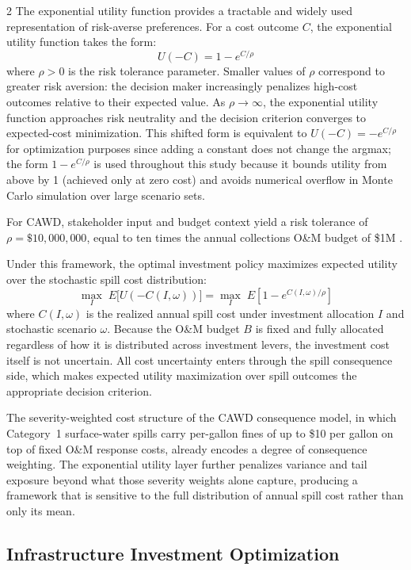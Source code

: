 \documentclass[10pt]{article}
\begin{document}
\begin{multicols}{2}
The exponential utility function provides a tractable and widely used
representation of risk-averse preferences. For a cost outcome $C$, the
exponential utility function takes the form:
%
\[
U(-C) = 1 - e^{C/\rho}
\]
%
where $\rho > 0$ is the risk tolerance parameter. Smaller values of
$\rho$ correspond to greater risk aversion: the decision maker
increasingly penalizes high-cost outcomes relative to their expected
value. As $\rho \to \infty$, the exponential utility function
approaches risk neutrality and the decision criterion converges to
expected-cost minimization. This shifted form is equivalent to
$U(-C) = -e^{C/\rho}$ for optimization purposes since adding a
constant does not change the argmax; the form $1 - e^{C/\rho}$ is
used throughout this study because it bounds utility from above by 1
(achieved only at zero cost) and avoids numerical overflow in Monte
Carlo simulation over large scenario sets.
 
For CAWD, stakeholder input and budget context yield a risk tolerance
of $\rho = \$10{,}000{,}000$, equal to ten times the annual
collections O\&M budget of \$1M \citep{cawd_budget2025}.
 
Under this framework, the optimal investment policy maximizes expected
utility over the stochastic spill cost distribution:
%
\[
\max_{I} \; E\bigl[U(-C(I,\omega))\bigr]
    = \max_{I} \; E\!\left[1 - e^{C(I,\omega)/\rho}\right]
\]
%
where $C(I,\omega)$ is the realized annual spill cost under investment
allocation $I$ and stochastic scenario $\omega$. Because the O\&M
budget $B$ is fixed and fully allocated regardless of how it is
distributed across investment levers, the investment cost itself is
not uncertain. All cost uncertainty enters through the spill
consequence side, which makes expected utility maximization over
spill outcomes the appropriate decision criterion.
 
The severity-weighted cost structure of the CAWD consequence model,
in which Category~1 surface-water spills carry per-gallon fines of
up to \$10 per gallon on top of fixed O\&M response costs, already
encodes a degree of consequence weighting. The exponential utility
layer further penalizes variance and tail exposure beyond what those
severity weights alone capture, producing a framework that is
sensitive to the full distribution of annual spill cost rather than
only its mean.

\subsection{Infrastructure Investment Optimization}
 

\end{multicols}
\end{document}
